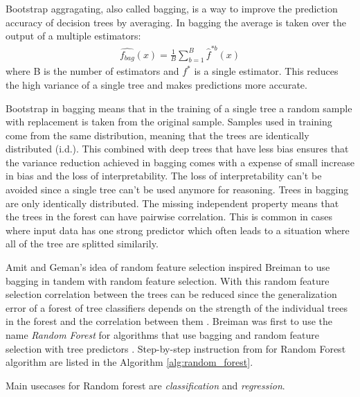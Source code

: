 Bootstrap aggragating, also called bagging, is a way to improve the prediction accuracy of decision trees by averaging. In bagging the average is taken over the output of a multiple estimators:
\begin{align}
    \hat {f_{bag}}(x) = \frac{1}{B}\sum_{b = 1}^{B} \hat {f}^{*b}(x)
\end{align}
where B is the number of estimators and ${f}^{*}$ is a single estimator. This reduces the high variance of a single tree and makes predictions more accurate.

Bootstrap in bagging means that in the training of a single tree a random sample with replacement is taken from the original sample. Samples used in training come from the same distribution, meaning that the trees are identically distributed (i.d.). This combined with deep trees that have less bias ensures that the variance reduction achieved in bagging comes with a expense of small increase in bias and the loss of interpretability. The loss of interpretability can't be avoided since a single tree can't be used anymore for reasoning. Trees in bagging are only identically distributed. The missing independent property means that the trees in the forest can have pairwise correlation. This is common in cases where input data has one strong predictor which often leads to a situation where all of the tree are splitted similarily. \cite{friedman2001elements}

Amit and Geman's \cite{amit1997shape} idea of random feature selection inspired Breiman to use bagging in tandem with random feature selection. With this random feature selection correlation between the trees can be reduced since the generalization error of a forest of tree classifiers depends on the strength of the individual trees in the forest and the correlation between them \cite{breiman2001random}. Breiman was first to use the name \textit{Random Forest} for algorithms that use bagging and random feature selection with tree predictors \cite{breiman2001random}. Step-by-step instruction from \cite{friedman2001elements} for Random Forest algorithm are listed in the Algorithm \ref{alg:random_forest}.

Main usecases for Random forest are \textit{classification} and \textit{regression}.

